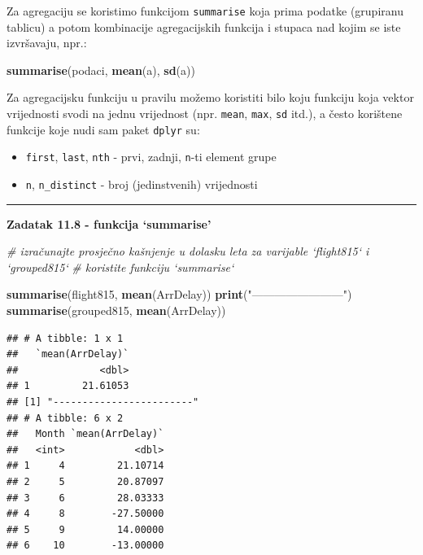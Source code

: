 \documentclass[]{book}
\newenvironment{Shaded}{\begin{snugshade}}{\end{snugshade}}
\newcommand{\KeywordTok}[1]{\textcolor[rgb]{0.13,0.29,0.53}{\textbf{#1}}}
\newcommand{\StringTok}[1]{\textcolor[rgb]{0.31,0.60,0.02}{#1}}
\newcommand{\CommentTok}[1]{\textcolor[rgb]{0.56,0.35,0.01}{\textit{#1}}}
\newcommand{\NormalTok}[1]{#1}
\providecommand{\tightlist}{%
  \setlength{\itemsep}{0pt}\setlength{\parskip}{0pt}}
\theoremstyle{definition}
\theoremstyle{definition}
\theoremstyle{definition}
\theoremstyle{remark}
\begin{document}
Za agregaciju se koristimo funkcijom \texttt{summarise} koja prima
podatke (grupiranu tablicu) a potom kombinacije agregacijskih funkcija i
stupaca nad kojim se iste izvršavaju, npr.:

\begin{Shaded}
\begin{Highlighting}[]
\KeywordTok{summarise}\NormalTok{(podaci, }\KeywordTok{mean}\NormalTok{(a), }\KeywordTok{sd}\NormalTok{(a))}
\end{Highlighting}
\end{Shaded}

Za agregacijsku funkciju u pravilu možemo koristiti bilo koju funkciju
koja vektor vrijednosti svodi na jednu vrijednost (npr. \texttt{mean},
\texttt{max}, \texttt{sd} itd.), a često korištene funkcije koje nudi
sam paket \texttt{dplyr} su:

\begin{itemize}
\tightlist
\item
  \texttt{first}, \texttt{last}, \texttt{nth} - prvi, zadnji,
  \texttt{n}-ti element grupe
\item
  \texttt{n}, \texttt{n\_distinct} - broj (jedinstvenih) vrijednosti
\end{itemize}

\begin{center}\rule{0.5\linewidth}{\linethickness}\end{center}

\textbf{Zadatak 11.8 - funkcija `summarise'}

\begin{Shaded}
\begin{Highlighting}[]
\CommentTok{# izračunajte prosječno kašnjenje u dolasku leta za varijable `flight815` i `grouped815`}
\CommentTok{# koristite funkciju `summarise`}
\end{Highlighting}
\end{Shaded}

\begin{Shaded}
\begin{Highlighting}[]
\KeywordTok{summarise}\NormalTok{(flight815, }\KeywordTok{mean}\NormalTok{(ArrDelay))}
\KeywordTok{print}\NormalTok{(}\StringTok{"------------------------"}\NormalTok{)   }
\KeywordTok{summarise}\NormalTok{(grouped815, }\KeywordTok{mean}\NormalTok{(ArrDelay))}
\end{Highlighting}
\end{Shaded}

\begin{verbatim}
## # A tibble: 1 x 1
##   `mean(ArrDelay)`
##              <dbl>
## 1         21.61053
## [1] "------------------------"
## # A tibble: 6 x 2
##   Month `mean(ArrDelay)`
##   <int>            <dbl>
## 1     4         21.10714
## 2     5         20.87097
## 3     6         28.03333
## 4     8        -27.50000
## 5     9         14.00000
## 6    10        -13.00000
\end{verbatim}
\end{document}
